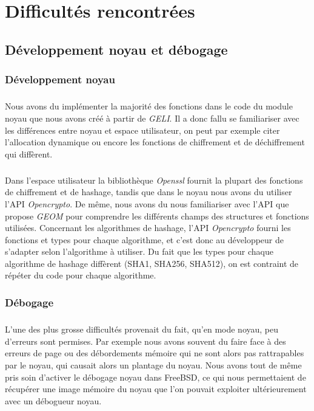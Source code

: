 \chapter{Difficultés rencontrées}

\section{Développement noyau et débogage}

\subsection{Développement noyau}

\paragraph{}Nous avons du implémenter la majorité des fonctions dans le code du
module noyau que nous avons créé à partir de {\em GELI}. Il a donc fallu se
familiariser avec les différences entre noyau et espace utilisateur, on peut
par exemple citer l'allocation dynamique ou encore les fonctions de chiffrement
et de déchiffrement qui diffèrent.

\paragraph{}
Dans l'espace utilisateur la bibliothèque {\em Openssl} fournit la plupart des
fonctions de chiffrement et de hashage, tandis que dans le noyau nous avons du
utiliser l'API {\em Opencrypto}. De même, nous avons du nous familiariser avec
l'API que propose {\em GEOM} pour comprendre les différents champs des
structures et fonctions utilisées. Concernant les algorithmes de hashage, l'API
{\em Opencrypto} fourni les fonctions et types pour chaque algorithme, et c'est
donc au développeur de s'adapter selon l'algorithme à utiliser. Du fait que
les types pour chaque algorithme de hashage diffèrent (SHA1, SHA256, SHA512),
on est contraint de répéter du code pour chaque algorithme.

\subsection{Débogage}
\paragraph{}
L'une des plus grosse difficultés provenait du fait, qu'en mode noyau,
peu d'erreurs sont permises. Par exemple nous avons souvent du faire face à
des erreurs de page ou des débordements mémoire qui ne sont alors pas
rattrapables par le noyau, qui causait alors un plantage du noyau. Nous avons
tout de même pris soin d'activer le débogage noyau dans FreeBSD, ce qui nous
permettaient de récupérer une image mémoire du noyau que l'on pouvait exploiter
ultérieurement avec un débogueur noyau.

